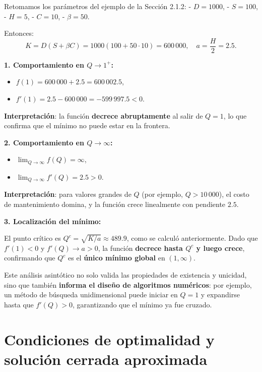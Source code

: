 \documentclass[
  spanish,
  us-letterpaper,
  DIV=11,
  numbers=noendperiod]{scrreprt}
\providecommand{\tightlist}{%
  \setlength{\itemsep}{0pt}\setlength{\parskip}{0pt}}
\numberwithin{equation}{section}
\begin{document}
Retomamos los parámetros del ejemplo de la Sección 2.1.2: -
\(D = 1000\), - \(S = 100\), - \(H = 5\), - \(C = 10\), -
\(\beta = 50\).

Entonces: \[
K = D(S + \beta C) = 1000(100 + 50 \cdot 10) = 600\,000,
\quad
a = \frac{H}{2} = 2.5.
\]

\textbf{1. Comportamiento en \(Q \to 1^+\):}

\begin{itemize}
\tightlist
\item
  \(f(1) = 600\,000 + 2.5 = 600\,002.5\),
\item
  \(f'(1) = 2.5 - 600\,000 = -599\,997.5 < 0\).
\end{itemize}

\textbf{Interpretación}: la función \textbf{decrece abruptamente} al
salir de \(Q = 1\), lo que confirma que el mínimo no puede estar en la
frontera.

\textbf{2. Comportamiento en \(Q \to \infty\):}

\begin{itemize}
\tightlist
\item
  \(\lim_{Q \to \infty} f(Q) = \infty\),
\item
  \(\lim_{Q \to \infty} f'(Q) = 2.5 > 0\).
\end{itemize}

\textbf{Interpretación}: para valores grandes de \(Q\) (por ejemplo,
\(Q > 10\,000\)), el costo de mantenimiento domina, y la función crece
linealmente con pendiente \(2.5\).

\textbf{3. Localización del mínimo:}

El punto crítico es \(Q^c = \sqrt{K/a} \approx 489.9\), como se calculó
anteriormente. Dado que \(f'(1) < 0\) y \(f'(Q) \to a > 0\), la función
\textbf{decrece hasta \(Q^c\) y luego crece}, confirmando que \(Q^c\) es
el \textbf{único mínimo global} en \((1, \infty)\).

Este análisis asintótico no solo valida las propiedades de existencia y
unicidad, sino que también \textbf{informa el diseño de algoritmos
numéricos}: por ejemplo, un método de búsqueda unidimensional puede
iniciar en \(Q = 1\) y expandirse hasta que \(f'(Q) > 0\), garantizando
que el mínimo ya fue cruzado.

\section{Condiciones de optimalidad y solución cerrada
aproximada}\label{condiciones-de-optimalidad-y-soluciuxf3n-cerrada-aproximada}
\end{document}
